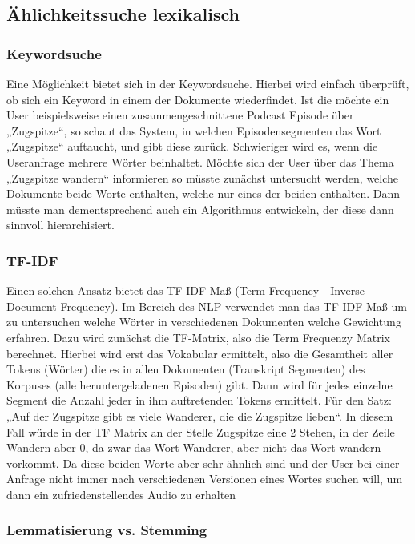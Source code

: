 \subsection{Ählichkeitssuche lexikalisch}

\subsubsection{Keywordsuche}

Eine Möglichkeit bietet sich in der Keywordsuche. 
Hierbei wird einfach überprüft, ob sich ein Keyword in einem der Dokumente wiederfindet. Ist die möchte ein User beispielsweise einen zusammengeschnittene Podcast Episode über „Zugspitze“, so schaut das System, in welchen Episodensegmenten das Wort „Zugspitze“ auftaucht, und gibt diese zurück. 
Schwieriger wird es, wenn die Useranfrage mehrere Wörter beinhaltet. 
Möchte sich der User über das Thema „Zugspitze wandern“ informieren so müsste zunächst untersucht werden, welche Dokumente beide Worte enthalten, welche nur eines der beiden enthalten. 
Dann müsste man dementsprechend auch ein Algorithmus entwickeln, der diese dann sinnvoll hierarchisiert. 

\subsubsection{TF-IDF}

Einen solchen Ansatz bietet das TF-IDF Maß (Term Frequency - Inverse Document Frequency). 
Im Bereich des NLP verwendet man das TF-IDF Maß um zu untersuchen welche Wörter in verschiedenen Dokumenten welche Gewichtung erfahren. 
Dazu wird zunächst die TF-Matrix, also die Term Frequenzy Matrix berechnet. 
Hierbei wird erst das Vokabular ermittelt, also die Gesamtheit aller Tokens (Wörter) die es in allen Dokumenten (Transkript Segmenten) des Korpuses (alle heruntergeladenen Episoden) gibt. 
Dann wird für jedes einzelne Segment die Anzahl jeder in ihm auftretenden Tokens ermittelt. 
Für den Satz: „Auf der Zugspitze gibt es viele Wanderer, die die Zugspitze lieben“. 
In diesem Fall würde in der TF Matrix an der Stelle Zugspitze eine 2 Stehen, in der Zeile Wandern aber 0, da zwar das Wort Wanderer, aber nicht das Wort wandern vorkommt. 
Da diese beiden Worte aber sehr ähnlich sind und der User bei einer Anfrage nicht immer nach verschiedenen Versionen eines Wortes suchen will, um dann ein zufriedenstellendes Audio zu erhalten

\subsubsection{Lemmatisierung vs. Stemming}

